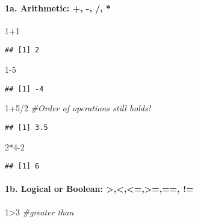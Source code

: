 \documentclass[]{article}
\newenvironment{Shaded}{\begin{snugshade}}{\end{snugshade}}
\newcommand{\DecValTok}[1]{\textcolor[rgb]{0.00,0.00,0.81}{{#1}}}
\newcommand{\CommentTok}[1]{\textcolor[rgb]{0.56,0.35,0.01}{\textit{{#1}}}}
\newcommand{\NormalTok}[1]{{#1}}
\let\oldparagraph\paragraph
\renewcommand{\paragraph}[1]{\oldparagraph{#1}\mbox{}}
\begin{document}
\paragraph{1a. Arithmetic: +, -, /, *}\label{a.-arithmetic--}

\begin{Shaded}
\begin{Highlighting}[]
\DecValTok{1+1}
\end{Highlighting}
\end{Shaded}

\begin{verbatim}
## [1] 2
\end{verbatim}

\begin{Shaded}
\begin{Highlighting}[]
\DecValTok{1-5}
\end{Highlighting}
\end{Shaded}

\begin{verbatim}
## [1] -4
\end{verbatim}

\begin{Shaded}
\begin{Highlighting}[]
\DecValTok{1+5}\NormalTok{/}\DecValTok{2} \CommentTok{#Order of operations still holds!}
\end{Highlighting}
\end{Shaded}

\begin{verbatim}
## [1] 3.5
\end{verbatim}

\begin{Shaded}
\begin{Highlighting}[]
\DecValTok{2}\NormalTok{*}\DecValTok{4-2}
\end{Highlighting}
\end{Shaded}

\begin{verbatim}
## [1] 6
\end{verbatim}

\paragraph{1b. Logical or Boolean:
\textgreater{},\textless{},\textless{}=,\textgreater{}=,==,
!=}\label{b.-logical-or-boolean}

\begin{Shaded}
\begin{Highlighting}[]
\DecValTok{1}\NormalTok{>}\DecValTok{3} \CommentTok{#greater than}
\end{Highlighting}
\end{Shaded}
\end{document}

